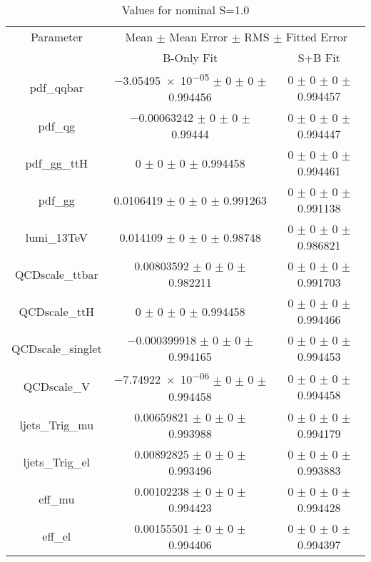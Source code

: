 \begin{table}
\centering
\caption{Values for nominal S=1.0}
\begin{tabular}{ccc}
\toprule
Parameter & \multicolumn{2}{c}{Mean $\pm$ Mean Error $\pm$ RMS $\pm$ Fitted Error}\\
 & B-Only Fit & S+B Fit\\
\midrule
pdf\_qqbar & \num{-3.05495e-05} $\pm$ \num{0} $\pm$ \num{0} $\pm$ \num{0.994456} & \num{0} $\pm$ \num{0} $\pm$ \num{0} $\pm$ \num{0.994457}\\
pdf\_qg & \num{-0.00063242} $\pm$ \num{0} $\pm$ \num{0} $\pm$ \num{0.99444} & \num{0} $\pm$ \num{0} $\pm$ \num{0} $\pm$ \num{0.994447}\\
pdf\_gg\_ttH & \num{0} $\pm$ \num{0} $\pm$ \num{0} $\pm$ \num{0.994458} & \num{0} $\pm$ \num{0} $\pm$ \num{0} $\pm$ \num{0.994461}\\
pdf\_gg & \num{0.0106419} $\pm$ \num{0} $\pm$ \num{0} $\pm$ \num{0.991263} & \num{0} $\pm$ \num{0} $\pm$ \num{0} $\pm$ \num{0.991138}\\
lumi\_13TeV & \num{0.014109} $\pm$ \num{0} $\pm$ \num{0} $\pm$ \num{0.98748} & \num{0} $\pm$ \num{0} $\pm$ \num{0} $\pm$ \num{0.986821}\\
QCDscale\_ttbar & \num{0.00803592} $\pm$ \num{0} $\pm$ \num{0} $\pm$ \num{0.982211} & \num{0} $\pm$ \num{0} $\pm$ \num{0} $\pm$ \num{0.991703}\\
QCDscale\_ttH & \num{0} $\pm$ \num{0} $\pm$ \num{0} $\pm$ \num{0.994458} & \num{0} $\pm$ \num{0} $\pm$ \num{0} $\pm$ \num{0.994466}\\
QCDscale\_singlet & \num{-0.000399918} $\pm$ \num{0} $\pm$ \num{0} $\pm$ \num{0.994165} & \num{0} $\pm$ \num{0} $\pm$ \num{0} $\pm$ \num{0.994453}\\
QCDscale\_V & \num{-7.74922e-06} $\pm$ \num{0} $\pm$ \num{0} $\pm$ \num{0.994458} & \num{0} $\pm$ \num{0} $\pm$ \num{0} $\pm$ \num{0.994458}\\
ljets\_Trig\_mu & \num{0.00659821} $\pm$ \num{0} $\pm$ \num{0} $\pm$ \num{0.993988} & \num{0} $\pm$ \num{0} $\pm$ \num{0} $\pm$ \num{0.994179}\\
ljets\_Trig\_el & \num{0.00892825} $\pm$ \num{0} $\pm$ \num{0} $\pm$ \num{0.993496} & \num{0} $\pm$ \num{0} $\pm$ \num{0} $\pm$ \num{0.993883}\\
eff\_mu & \num{0.00102238} $\pm$ \num{0} $\pm$ \num{0} $\pm$ \num{0.994423} & \num{0} $\pm$ \num{0} $\pm$ \num{0} $\pm$ \num{0.994428}\\
eff\_el & \num{0.00155501} $\pm$ \num{0} $\pm$ \num{0} $\pm$ \num{0.994406} & \num{0} $\pm$ \num{0} $\pm$ \num{0} $\pm$ \num{0.994397}\\

\end{tabular}
\end{table}
